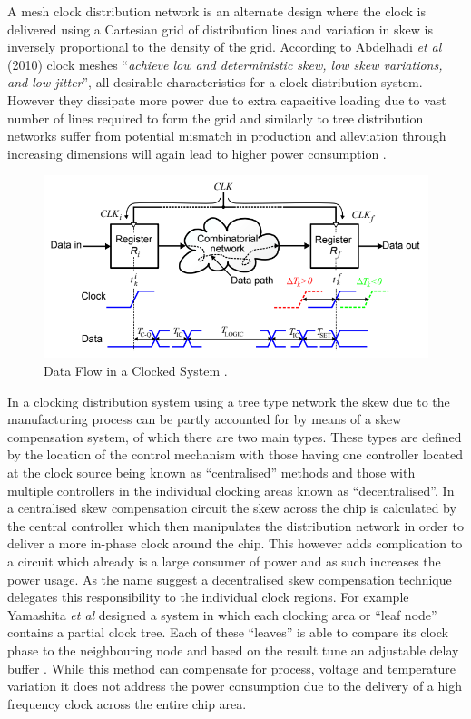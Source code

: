 \documentclass[11pt,english,british]{report}
\begin{document}
A mesh clock distribution network is an alternate design where the clock is delivered using a Cartesian grid of distribution lines and variation in skew is inversely proportional to the density of the grid. According to Abdelhadi \textit{et al} (2010) clock meshes ``\textit{achieve low and deterministic skew, low skew variations, and low jitter}'', all desirable characteristics for a clock distribution system. However they dissipate more power due to extra capacitive loading due to vast number of lines required to form the grid and similarly to tree distribution networks suffer from potential mismatch in production and alleviation through increasing dimensions will again lead to higher power consumption \cite{abdelhadi2010timing}. 
\begin{figure}[h]
	\centering
	\includegraphics[scale=0.5]{../eldar_why_precise_clocking}
	\caption{Data Flow in a Clocked System \cite{zianbetov2013distributed}.}%
	\label{fig:mesh}
\end{figure}

In a clocking distribution system using a tree type network the skew due to the manufacturing process can be partly accounted for by means of a skew compensation system, of which there are two main types. These types are defined by the location of the control mechanism with those having one controller located at the clock source being known as ``centralised'' methods and those with multiple controllers in the individual clocking areas known as ``decentralised''. In a centralised skew compensation circuit the skew across the chip is calculated by the central controller which then manipulates the distribution network in order to deliver a more in-phase clock around the chip. This however adds complication to a circuit which already is a large consumer of power and as such increases the power usage.
As the name suggest a decentralised skew compensation technique delegates this responsibility to the individual clock regions. For example Yamashita \textit{et al} designed a system in which each clocking area or ``leaf node'' contains a partial clock tree. Each of these ``leaves'' is able to compare its clock phase to the neighbouring node and based on the result tune an adjustable delay buffer \cite{yamashita2005dynamic}. While this method can compensate for process, voltage and temperature variation it does not address the power consumption due to the delivery of a high frequency clock across the entire chip area.
\end{document}
